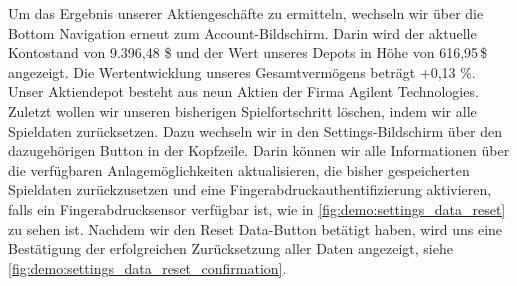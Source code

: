 \documentclass[a4paper]{article}
\begin{document}
Um das Ergebnis unserer Aktiengeschäfte zu ermitteln, wechseln wir über die Bottom Navigation erneut zum Account-Bildschirm. Darin wird der aktuelle Kontostand von 9.396,48 \$ und der Wert unseres Depots in Höhe von 616,95\,\$ angezeigt. Die Wertentwicklung unseres Gesamtvermögens beträgt +0,13 \%. Unser Aktiendepot besteht aus neun Aktien der Firma Agilent Technologies.\newline
Zuletzt wollen wir unseren bisherigen Spielfortschritt löschen, indem wir alle Spieldaten zurücksetzen. Dazu wechseln wir in den Settings-Bildschirm über den dazugehörigen Button in der Kopfzeile. Darin können wir alle Informationen über die verfügbaren Anlagemöglichkeiten aktualisieren, die bisher gespeicherten Spieldaten zurückzusetzen und eine Fingerabdruckauthentifizierung aktivieren, falls ein Fingerabdrucksensor verfügbar ist, wie in \autoref{fig:demo:settings_data_reset} zu sehen ist. Nachdem wir den Reset Data-Button betätigt haben, wird uns eine Bestätigung der erfolgreichen Zurücksetzung aller Daten angezeigt, siehe \autoref{fig:demo:settings_data_reset_confirmation}.
\end{document}
